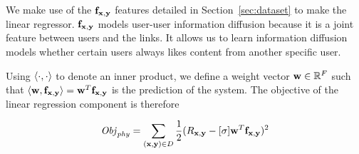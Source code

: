 We make use of the $\mathbf{f}_{\mathbf{x},\mathbf{y}}$ features detailed in Section~\ref{sec:dataset} to make the linear regressor. $\mathbf{f}_{\mathbf{x},\mathbf{y}}$ models user-user information diffusion because it is a joint feature between users and the links. It allows us to learn information diffusion models whether certain users always likes content from another specific user.


Using $\langle \cdot,\cdot \rangle$ to denote an inner product, we define a weight
vector $\mathbf{w} \in \mathbb{R}^F$ such that $\langle \mathbf{w}, \mathbf{f}_{\mathbf{x},\mathbf{y}} \rangle = \mathbf{w}^T \mathbf{f}_{\mathbf{x},\mathbf{y}}$ is the prediction of the system. The objective of the linear regression component is therefore

\begin{align*}
\mathit{Obj}_{\mathit{phy}} = \sum_{(\mathbf{x},\mathbf{y}) \in D} \frac{1}{2} (R_{\mathbf{x},\mathbf{y}} - [\sigma] \mathbf{w}^T \mathbf{f}_{\mathbf{x},\mathbf{y}})^2
\end{align*}

